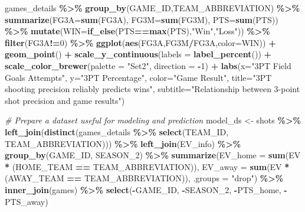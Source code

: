 \documentclass[
  12pt,
  a4paper,
]{article}
\newenvironment{Shaded}{\begin{snugshade}}{\end{snugshade}}
\newcommand{\AttributeTok}[1]{\textcolor[rgb]{0.13,0.29,0.53}{#1}}
\newcommand{\CommentTok}[1]{\textcolor[rgb]{0.56,0.35,0.01}{\textit{#1}}}
\newcommand{\DecValTok}[1]{\textcolor[rgb]{0.00,0.00,0.81}{#1}}
\newcommand{\FunctionTok}[1]{\textcolor[rgb]{0.13,0.29,0.53}{\textbf{#1}}}
\newcommand{\NormalTok}[1]{#1}
\newcommand{\OtherTok}[1]{\textcolor[rgb]{0.56,0.35,0.01}{#1}}
\newcommand{\SpecialCharTok}[1]{\textcolor[rgb]{0.81,0.36,0.00}{\textbf{#1}}}
\newcommand{\StringTok}[1]{\textcolor[rgb]{0.31,0.60,0.02}{#1}}
\begin{document}
\begin{Shaded}
\begin{Highlighting}[]
\NormalTok{games\_details }\SpecialCharTok{\%\textgreater{}\%}
  \FunctionTok{group\_by}\NormalTok{(GAME\_ID,TEAM\_ABBREVIATION) }\SpecialCharTok{\%\textgreater{}\%}
  \FunctionTok{summarize}\NormalTok{(}\AttributeTok{FG3A=}\FunctionTok{sum}\NormalTok{(FG3A), }\AttributeTok{FG3M=}\FunctionTok{sum}\NormalTok{(FG3M),}
            \AttributeTok{PTS=}\FunctionTok{sum}\NormalTok{(PTS)) }\SpecialCharTok{\%\textgreater{}\%}
  \FunctionTok{mutate}\NormalTok{(}\AttributeTok{WIN=}\FunctionTok{if\_else}\NormalTok{(PTS}\SpecialCharTok{==}\FunctionTok{max}\NormalTok{(PTS),}\StringTok{"Win"}\NormalTok{,}\StringTok{"Loss"}\NormalTok{)) }\SpecialCharTok{\%\textgreater{}\%}
  \FunctionTok{filter}\NormalTok{(FG3A}\SpecialCharTok{!=}\DecValTok{0}\NormalTok{) }\SpecialCharTok{\%\textgreater{}\%}
  \FunctionTok{ggplot}\NormalTok{(}\FunctionTok{aes}\NormalTok{(FG3A,FG3M}\SpecialCharTok{/}\NormalTok{FG3A,}\AttributeTok{color=}\NormalTok{WIN)) }\SpecialCharTok{+}
  \FunctionTok{geom\_point}\NormalTok{() }\SpecialCharTok{+}
  \FunctionTok{scale\_y\_continuous}\NormalTok{(}\AttributeTok{labels =} \FunctionTok{label\_percent}\NormalTok{()) }\SpecialCharTok{+}
  \FunctionTok{scale\_color\_brewer}\NormalTok{(}\AttributeTok{palette =} \StringTok{"Set2"}\NormalTok{, }\AttributeTok{direction =} \SpecialCharTok{{-}}\DecValTok{1}\NormalTok{) }\SpecialCharTok{+}
  \FunctionTok{labs}\NormalTok{(}\AttributeTok{x=}\StringTok{"3PT Field Goals Attempts"}\NormalTok{, }\AttributeTok{y=}\StringTok{"3PT Percentage"}\NormalTok{,}
       \AttributeTok{color=}\StringTok{"Game Result"}\NormalTok{,}
       \AttributeTok{title=}\StringTok{"3PT shooting precision reliably predicts wins"}\NormalTok{,}
       \AttributeTok{subtitle=}\StringTok{"Relationship between 3{-}point shot}
\StringTok{                 precision and game results"}\NormalTok{)}

\CommentTok{\# Prepare a dataset useful for modeling and prediction}
\NormalTok{model\_ds }\OtherTok{\textless{}{-}}\NormalTok{ shots }\SpecialCharTok{\%\textgreater{}\%}
  \FunctionTok{left\_join}\NormalTok{(}\FunctionTok{distinct}\NormalTok{(games\_details }\SpecialCharTok{\%\textgreater{}\%}
                      \FunctionTok{select}\NormalTok{(TEAM\_ID, TEAM\_ABBREVIATION))) }\SpecialCharTok{\%\textgreater{}\%}
  \FunctionTok{left\_join}\NormalTok{(EV\_info) }\SpecialCharTok{\%\textgreater{}\%}
  \FunctionTok{group\_by}\NormalTok{(GAME\_ID, SEASON\_2) }\SpecialCharTok{\%\textgreater{}\%}
  \FunctionTok{summarize}\NormalTok{(}\AttributeTok{EV\_home =} \FunctionTok{sum}\NormalTok{(EV }\SpecialCharTok{*}\NormalTok{ (HOME\_TEAM }\SpecialCharTok{==}\NormalTok{ TEAM\_ABBREVIATION)),}
            \AttributeTok{EV\_away =} \FunctionTok{sum}\NormalTok{(EV }\SpecialCharTok{*}\NormalTok{ (AWAY\_TEAM }\SpecialCharTok{==}\NormalTok{ TEAM\_ABBREVIATION)),}
            \AttributeTok{.groups =} \StringTok{"drop"}\NormalTok{) }\SpecialCharTok{\%\textgreater{}\%}
  \FunctionTok{inner\_join}\NormalTok{(games) }\SpecialCharTok{\%\textgreater{}\%}
  \FunctionTok{select}\NormalTok{(}\SpecialCharTok{{-}}\NormalTok{GAME\_ID, }\SpecialCharTok{{-}}\NormalTok{SEASON\_2,}
         \SpecialCharTok{{-}}\NormalTok{PTS\_home, }\SpecialCharTok{{-}}\NormalTok{PTS\_away)}


\end{Highlighting}
\end{Shaded}
\end{document}
